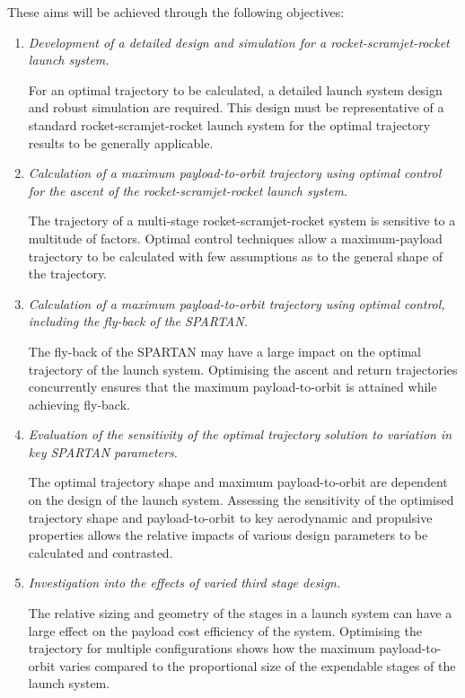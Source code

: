     
\vspace*{10pt}
    \noindent These aims will be achieved through the following objectives:
    \begin{enumerate}
    	 \item \emph{Development of a detailed design and simulation for a rocket-scramjet-rocket launch system.}
    	 
    	   For an optimal trajectory to be calculated, a detailed launch system design and robust simulation are required. This design must be representative of a standard rocket-scramjet-rocket launch system for the optimal trajectory results to be generally applicable.\\

\item \emph{Calculation of a maximum payload-to-orbit trajectory using optimal control for the ascent of the rocket-scramjet-rocket launch system.}

The trajectory of a multi-stage rocket-scramjet-rocket system is sensitive to a multitude of factors. Optimal control techniques allow a maximum-payload trajectory to be calculated with few assumptions as to the general shape of the trajectory. \\

\item \emph{Calculation of a maximum payload-to-orbit trajectory using optimal control, including the fly-back of the SPARTAN.}

The fly-back of the SPARTAN may have a large impact on the optimal trajectory of the launch system. Optimising the ascent and return trajectories concurrently ensures that the maximum payload-to-orbit is attained while achieving fly-back. \\
    	
      \item \emph{Evaluation of the sensitivity of the optimal trajectory solution to variation in key SPARTAN parameters.} 

	The optimal trajectory shape and maximum payload-to-orbit are dependent on the design of the launch system. 
	Assessing the sensitivity of the optimised trajectory shape and payload-to-orbit to key aerodynamic and propulsive properties allows the relative impacts of various design parameters to be calculated and contrasted. \\

      \item \emph{Investigation into the effects of varied third stage design.}

The relative sizing and geometry of the stages in a launch system can have a large effect on the payload cost efficiency of the system. Optimising the trajectory for multiple configurations shows how the maximum payload-to-orbit varies compared to the proportional size of the expendable stages of the launch system. \\


    \end{enumerate}

